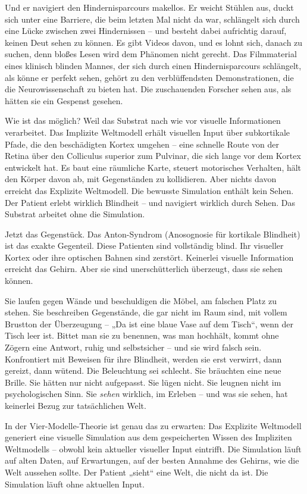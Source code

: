 \documentclass[11pt, twoside, openright]{book}
\begin{document}
Und er navigiert den Hindernisparcours makellos. Er weicht Stühlen aus, duckt sich unter eine Barriere, die beim letzten Mal nicht da war, schlängelt sich durch eine Lücke zwischen zwei Hindernissen -- und besteht dabei aufrichtig darauf, keinen Deut sehen zu können. Es gibt Videos davon, und es lohnt sich, danach zu suchen, denn bloßes Lesen wird dem Phänomen nicht gerecht. Das Filmmaterial eines klinisch blinden Mannes, der sich durch einen Hindernisparcours schlängelt, als könne er perfekt sehen, gehört zu den verblüffendsten Demonstrationen, die die Neurowissenschaft zu bieten hat. Die zuschauenden Forscher sehen aus, als hätten sie ein Gespenst gesehen.

Wie ist das möglich? Weil das Substrat nach wie vor visuelle Informationen verarbeitet. Das Implizite Weltmodell erhält visuellen Input über subkortikale Pfade, die den beschädigten Kortex umgehen -- eine schnelle Route von der Retina über den Colliculus superior zum Pulvinar, die sich lange vor dem Kortex entwickelt hat. Es baut eine räumliche Karte, steuert motorisches Verhalten, hält den Körper davon ab, mit Gegenständen zu kollidieren. Aber nichts davon erreicht das Explizite Weltmodell. Die bewusste Simulation enthält kein Sehen. Der Patient erlebt wirklich Blindheit -- und navigiert wirklich durch Sehen. Das Substrat arbeitet ohne die Simulation.

Jetzt das Gegenstück. Das Anton-Syndrom (Anosognosie für kortikale Blindheit) ist das exakte Gegenteil. Diese Patienten sind vollständig blind. Ihr visueller Kortex oder ihre optischen Bahnen sind zerstört. Keinerlei visuelle Information erreicht das Gehirn. Aber sie sind unerschütterlich überzeugt, dass sie sehen können.

Sie laufen gegen Wände und beschuldigen die Möbel, am falschen Platz zu stehen. Sie beschreiben Gegenstände, die gar nicht im Raum sind, mit vollem Brustton der Überzeugung -- „Da ist eine blaue Vase auf dem Tisch“, wenn der Tisch leer ist. Bittet man sie zu benennen, was man hochhält, kommt ohne Zögern eine Antwort, ruhig und selbstsicher -- und sie wird falsch sein. Konfrontiert mit Beweisen für ihre Blindheit, werden sie erst verwirrt, dann gereizt, dann wütend. Die Beleuchtung sei schlecht. Sie bräuchten eine neue Brille. Sie hätten nur nicht aufgepasst. Sie lügen nicht. Sie leugnen nicht im psychologischen Sinn. Sie \textit{sehen} wirklich, im Erleben -- und was sie sehen, hat keinerlei Bezug zur tatsächlichen Welt.

In der Vier-Modelle-Theorie ist genau das zu erwarten: Das Explizite Weltmodell generiert eine visuelle Simulation aus dem gespeicherten Wissen des Impliziten Weltmodells -- obwohl kein aktueller visueller Input eintrifft. Die Simulation läuft auf alten Daten, auf Erwartungen, auf der besten Annahme des Gehirns, wie die Welt aussehen sollte. Der Patient „sieht“ eine Welt, die nicht da ist. Die Simulation läuft ohne aktuellen Input.
\end{document}
